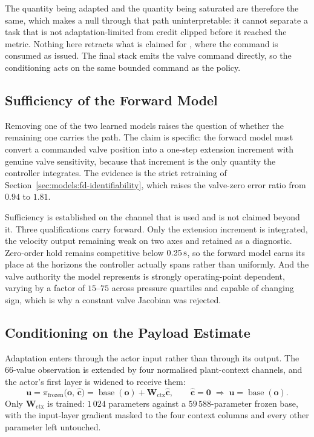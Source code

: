 The quantity being adapted and the quantity being saturated are therefore the
same, which makes a null through that path uninterpretable: it cannot separate a
task that is not adaptation-limited from credit clipped before it reached the
metric. Nothing here retracts what is claimed for \ppoIDFD{}, where the command
is consumed as issued. The final stack emits the valve command directly, so the
conditioning acts on the same bounded command as the policy.

\subsection{Sufficiency of the Forward Model}
\label{sec:ctrl:af-fd-sufficient}

Removing one of the two learned models raises the question of whether the
remaining one carries the path. The claim is specific: the forward model must
convert a commanded valve position into a one-step extension increment with
genuine valve sensitivity, because that increment is the only quantity the
controller integrates. The evidence is the strict retraining of
Section~\ref{sec:models:fd-identifiability}, which raises the valve-zero error
ratio from $0.94$ to $1.81$.

Sufficiency is established on the channel that is used and is not claimed beyond
it. Three qualifications carry forward. Only the extension increment is
integrated, the velocity output remaining weak on two axes and retained as a
diagnostic. Zero-order hold remains competitive below $\unit[0.25]{s}$, so the
forward model earns its place at the horizons the controller actually spans
rather than uniformly. And the valve authority the model represents is strongly
operating-point dependent, varying by a factor of $15$--$75$ across pressure
quartiles and capable of changing sign, which is why a constant valve Jacobian
was rejected.

\subsection{Conditioning on the Payload Estimate}
\label{sec:ctrl:af-residual}

Adaptation enters through the actor input rather than through its output. The
$66$-value observation is extended by four normalised plant-context channels,
and the actor's first layer is widened to receive them:
%
\begin{equation}
  \label{eq:ctrl:af-residual}
  \bm{u} = \pi_{\mathrm{frozen}}\bigl( \bm{o},\, \hat{\bm{c}} \bigr)
  = \operatorname{base}(\bm{o}) + \bm{W}_{\mathrm{ctx}} \hat{\bm{c}} ,
  \qquad
  \hat{\bm{c}} = \bm{0} \;\Rightarrow\; \bm{u} = \operatorname{base}(\bm{o}) .
\end{equation}
%
Only $\bm{W}_{\mathrm{ctx}}$ is trained: $1\,024$ parameters against a
$59\,588$-parameter frozen base, with the input-layer gradient masked to the
four context columns and every other parameter left untouched.

